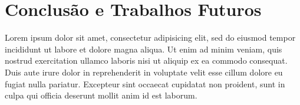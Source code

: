 \section{Conclusão e Trabalhos Futuros}


Lorem ipsum dolor sit amet, consectetur adipisicing elit, sed do eiusmod
tempor incididunt ut labore et dolore magna aliqua. Ut enim ad minim veniam,
quis nostrud exercitation ullamco laboris nisi ut aliquip ex ea commodo
consequat. Duis aute irure dolor in reprehenderit in voluptate velit esse
cillum dolore eu fugiat nulla pariatur. Excepteur sint occaecat cupidatat non
proident, sunt in culpa qui officia deserunt mollit anim id est laborum.
